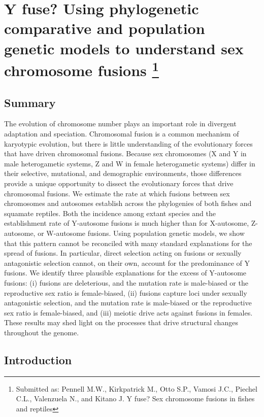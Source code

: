 \chapter[Y fuse? Using phylogenetic comparative and population genetic models to understand sex chromosome fusions]{Y fuse? Using phylogenetic comparative and population genetic models to understand sex chromosome fusions \footnote{Submitted as: Pennell M.W., Kirkpatrick M., Otto S.P., Vamosi J.C., Piechel C.L., Valenzuela N., and Kitano J. Y fuse? Sex chromosome fusions in fishes and reptiles}}
\label{chap:sexchrom}

\section{Summary}

The evolution of chromosome number plays an important role in divergent adaptation and speciation. Chromosomal fusion is a common mechanism of karyotypic evolution, but there is little understanding of the evolutionary forces that have driven chromosomal fusions. Because sex chromosomes (X and Y in male heterogametic systems, Z and W in female heterogametic systems) differ in their selective, mutational, and demographic environments, those differences provide a unique opportunity to dissect the evolutionary forces that drive chromosomal fusions. We estimate the rate at which fusions between sex chromosomes and autosomes establish across the phylogenies of both fishes and squamate reptiles. Both the incidence among extant species and the establishment rate of Y-autosome fusions is much higher than for X-autosome, Z-autosome, or W-autosome fusions. Using population genetic models, we show that this pattern cannot be reconciled with many standard explanations for the spread of fusions. In particular, direct selection acting on fusions or sexually antagonistic selection cannot, on their own, account for the predominance of Y fusions. We identify three plausible explanations for the excess of Y-autosome fusions: (i) fusions are deleterious, and the mutation rate is male-biased or the reproductive sex ratio is female-biased, (ii) fusions capture loci under sexually antagonistic selection, and the mutation rate is male-biased or the reproductive sex ratio is female-biased, and (iii) meiotic drive acts against fusions in females. These results may shed light on the processes that drive structural changes throughout the genome.

\section{Introduction}

